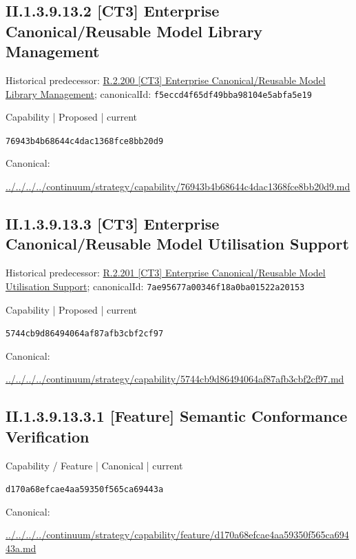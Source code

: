 \documentclass[10pt,a4paper]{article}
\begin{document}
\subsection*{II.1.3.9.13.2 [CT3] Enterprise Canonical/Reusable Model Library Management}
Historical predecessor: \hyperref[element-f5eccd4f65df49bba98104e5abfa5e19]{R.2.200 [CT3] Enterprise Canonical/Reusable Model Library Management}; canonicalId: \texttt{f5eccd4f65df49bba98104e5abfa5e19}\par
\label{element-76943b4b68644c4dac1368fce8bb20d9}
{\small Capability | Proposed | current}\par
\texttt{76943b4b68644c4dac1368fce8bb20d9}\par
Canonical: \par
{\footnotesize\url{../../../../continuum/strategy/capability/76943b4b68644c4dac1368fce8bb20d9.md}}\par
\subsection*{II.1.3.9.13.3 [CT3] Enterprise Canonical/Reusable Model Utilisation Support}
Historical predecessor: \hyperref[element-7ae95677a00346f18a0ba01522a20153]{R.2.201 [CT3] Enterprise Canonical/Reusable Model Utilisation Support}; canonicalId: \texttt{7ae95677a00346f18a0ba01522a20153}\par
\label{element-5744cb9d86494064af87afb3cbf2cf97}
{\small Capability | Proposed | current}\par
\texttt{5744cb9d86494064af87afb3cbf2cf97}\par
Canonical: \par
{\footnotesize\url{../../../../continuum/strategy/capability/5744cb9d86494064af87afb3cbf2cf97.md}}\par
\subsection*{II.1.3.9.13.3.1 [Feature] Semantic Conformance Verification}
\label{element-d170a68efcae4aa59350f565ca69443a}
{\small Capability / Feature | Canonical | current}\par
\texttt{d170a68efcae4aa59350f565ca69443a}\par
Canonical: \par
{\footnotesize\url{../../../../continuum/strategy/capability/feature/d170a68efcae4aa59350f565ca69443a.md}}\par
\end{document}
